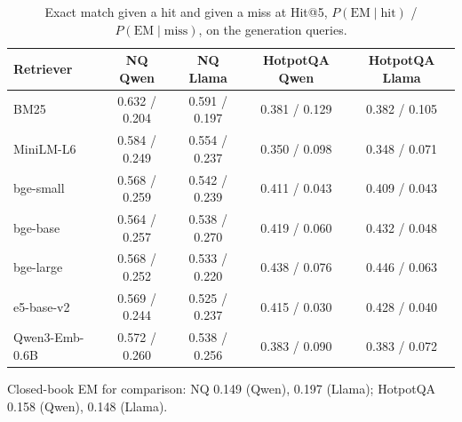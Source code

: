 \begin{table}[t]
\centering
\small
\caption{Exact match given a hit and given a miss at Hit@5, $P(\mathrm{EM}\mid\mathrm{hit})$ / $P(\mathrm{EM}\mid\mathrm{miss})$, on the generation queries.}
\label{tab:decomp}
\begin{tabular}{lcccc}
\toprule
Retriever & NQ Qwen & NQ Llama & HotpotQA Qwen & HotpotQA Llama \\
\midrule
BM25 & 0.632 / 0.204 & 0.591 / 0.197 & 0.381 / 0.129 & 0.382 / 0.105 \\
MiniLM-L6 & 0.584 / 0.249 & 0.554 / 0.237 & 0.350 / 0.098 & 0.348 / 0.071 \\
bge-small & 0.568 / 0.259 & 0.542 / 0.239 & 0.411 / 0.043 & 0.409 / 0.043 \\
bge-base & 0.564 / 0.257 & 0.538 / 0.270 & 0.419 / 0.060 & 0.432 / 0.048 \\
bge-large & 0.568 / 0.252 & 0.533 / 0.220 & 0.438 / 0.076 & 0.446 / 0.063 \\
e5-base-v2 & 0.569 / 0.244 & 0.525 / 0.237 & 0.415 / 0.030 & 0.428 / 0.040 \\
Qwen3-Emb-0.6B & 0.572 / 0.260 & 0.538 / 0.256 & 0.383 / 0.090 & 0.383 / 0.072 \\
\bottomrule
\end{tabular}
\par\smallskip\parbox{\linewidth}{\footnotesize Closed-book EM for comparison: NQ 0.149 (Qwen), 0.197 (Llama); HotpotQA 0.158 (Qwen), 0.148 (Llama).}
\end{table}
